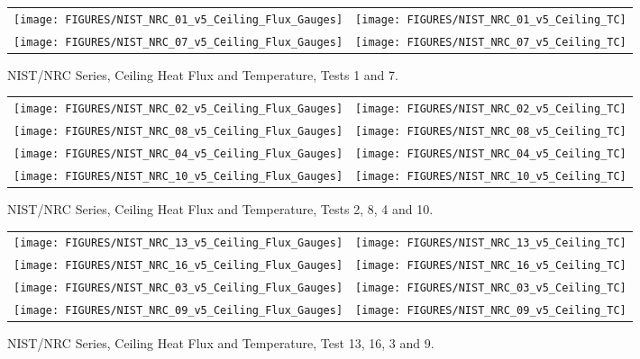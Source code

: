 \begin{figure}[h!]
\begin{tabular*}{\textwidth}{l@{\extracolsep{\fill}}r}
\texttt{[image: FIGURES/NIST\_NRC\_01\_v5\_Ceiling\_Flux\_Gauges]} &
\texttt{[image: FIGURES/NIST\_NRC\_01\_v5\_Ceiling\_TC]} \\
\texttt{[image: FIGURES/NIST\_NRC\_07\_v5\_Ceiling\_Flux\_Gauges]} &
\texttt{[image: FIGURES/NIST\_NRC\_07\_v5\_Ceiling\_TC]}

\end{tabular*}
\caption{NIST/NRC Series, Ceiling Heat Flux and Temperature, Tests 1 and 7.}
\label{NIST_NRC_Ceiling_1}
\end{figure}

\begin{figure}[p]
\begin{tabular*}{\textwidth}{l@{\extracolsep{\fill}}r}
\texttt{[image: FIGURES/NIST\_NRC\_02\_v5\_Ceiling\_Flux\_Gauges]} &
\texttt{[image: FIGURES/NIST\_NRC\_02\_v5\_Ceiling\_TC]} \\
\texttt{[image: FIGURES/NIST\_NRC\_08\_v5\_Ceiling\_Flux\_Gauges]} &
\texttt{[image: FIGURES/NIST\_NRC\_08\_v5\_Ceiling\_TC]} \\
\texttt{[image: FIGURES/NIST\_NRC\_04\_v5\_Ceiling\_Flux\_Gauges]} &
\texttt{[image: FIGURES/NIST\_NRC\_04\_v5\_Ceiling\_TC]} \\
\texttt{[image: FIGURES/NIST\_NRC\_10\_v5\_Ceiling\_Flux\_Gauges]} &
\texttt{[image: FIGURES/NIST\_NRC\_10\_v5\_Ceiling\_TC]}

\end{tabular*}
\caption{NIST/NRC Series, Ceiling Heat Flux and Temperature, Tests 2, 8, 4 and 10.}
\label{NIST_NRC_Ceiling_2}
\end{figure}

\begin{figure}[p]
\begin{tabular*}{\textwidth}{l@{\extracolsep{\fill}}r}
\texttt{[image: FIGURES/NIST\_NRC\_13\_v5\_Ceiling\_Flux\_Gauges]} &
\texttt{[image: FIGURES/NIST\_NRC\_13\_v5\_Ceiling\_TC]} \\
\texttt{[image: FIGURES/NIST\_NRC\_16\_v5\_Ceiling\_Flux\_Gauges]} &
\texttt{[image: FIGURES/NIST\_NRC\_16\_v5\_Ceiling\_TC]} \\
\texttt{[image: FIGURES/NIST\_NRC\_03\_v5\_Ceiling\_Flux\_Gauges]} &
\texttt{[image: FIGURES/NIST\_NRC\_03\_v5\_Ceiling\_TC]} \\
\texttt{[image: FIGURES/NIST\_NRC\_09\_v5\_Ceiling\_Flux\_Gauges]} &
\texttt{[image: FIGURES/NIST\_NRC\_09\_v5\_Ceiling\_TC]}

\end{tabular*}
\caption{NIST/NRC Series, Ceiling Heat Flux and Temperature, Test 13, 16, 3 and 9.}
\label{NIST_NRC_Ceiling_3}
\end{figure}

